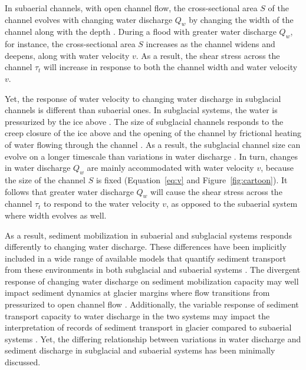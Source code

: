 \documentclass[11pt]{article}
\begin{document}
\begin{spacing}{1}
  In subaerial channels, with open channel flow, the cross-sectional area $S$ of the channel evolves with changing water discharge $Q_w$  by changing the width of the channel along with the depth \citep{leopold1953}. During a flood with greater water discharge $Q_w$, for instance, the cross-sectional area $S$ increases as the channel widens and deepens, along with water velocity $v$. As a result, the shear stress across the channel $\tau_t$ will increase in response to both the channel width  and water velocity $v$. 

  Yet, the response of water velocity to changing water discharge in subglacial channels is different than subaerial ones.
  In subglacial systems, the water is pressurized by the ice above \citep{shreve1972}.
  The size of subglacial channels responds to the creep closure of the ice above and the opening of the channel by frictional heating of water flowing through the channel \citep{rothlisberger1972}.
  As a result, the subglacial channel size can evolve on a longer timescale than variations in water discharge \citep[e.g.][]{iken1986,andrews2014,nanni2020}.
  In turn, changes in water discharge $Q_w$ are mainly accommodated with water velocity $v$, because the size of the channel $S$ is fixed (Equation~\ref{eq:v} and Figure~\ref{fig:cartoon}).
  It follows that greater water discharge $Q_w$ will cause the shear stress across the channel $\tau_t$ to respond to the water velocity $v$, as opposed to the subaerial system where width evolves as well. 

  As a result, sediment mobilization in subaerial and subglacial systems responds differently to changing water discharge.
  These differences have been implicitly included in a wide range of available models that  quantify sediment transport from these environments in both subglacial and subaerial systems  \citep[e.g.][]{walder1994,tucker1997,creyts2013,wickert2019,hewitt2019}.
  The divergent response of changing water discharge on sediment mobilization capacity may well impact sediment dynamics at glacier margins where flow transitions from pressurized to open channel flow \citep[e.g.][]{lane2016}.
  Additionally, the variable response of sediment transport capacity to water discharge in the two systems may impact the interpretation of records of sediment transport in glacier compared to subaerial systems \citep[e.g.][]{muller1968,richards2003,ganti2016}.
  Yet, the differing relationship between variations in water discharge and sediment discharge in subglacial and subaerial systems has been minimally discussed.
  

\end{spacing}
\end{document}
